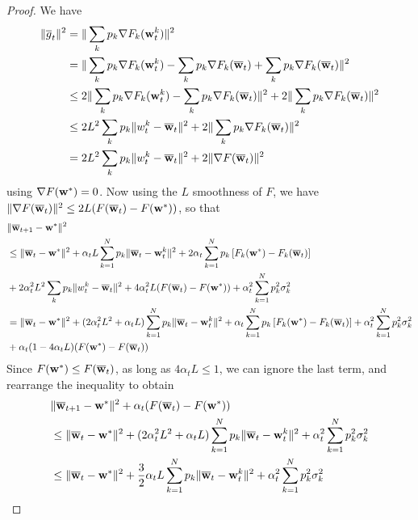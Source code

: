 \begin{proof}
	We have
	\begin{align*}
	\|\overline{g}_{t}\|^{2} & =\|\sum_{k}p_{k}\nabla F_{k}({\mathbf{w}}_{t}^{k})\|^{2}\\
	& =\|\sum_{k}p_{k}\nabla F_{k}({\mathbf{w}}_{t}^{k})-\sum_{k}p_{k}\nabla F_{k}({\overline{\mathbf{w}}}_{t})+\sum_{k}p_{k}\nabla F_{k}({\overline{\mathbf{w}}}_{t})\|^{2}\\
	& \leq2\|\sum_{k}p_{k}\nabla F_{k}({\mathbf{w}}_{t}^{k})-\sum_{k}p_{k}\nabla F_{k}({\overline{\mathbf{w}}}_{t})\|^{2}+2\|\sum_{k}p_{k}\nabla F_{k}({\overline{\mathbf{w}}}_{t})\|^{2}\\
	& \leq2L^{2}\sum_{k}p_{k}\|w_{t}^{k}-{\overline{\mathbf{w}}}_{t}\|^{2}+2\|\sum_{k}p_{k}\nabla F_{k}({\overline{\mathbf{w}}}_{t})\|^{2}\\
	& =2L^{2}\sum_{k}p_{k}\|w_{t}^{k}-{\overline{\mathbf{w}}}_{t}\|^{2}+2\|\nabla F({\overline{\mathbf{w}}}_{t})\|^{2}
	\end{align*}
	using $\nabla F({\mathbf{w}}^{\ast})=0$. Now using the $L$ smoothness of $F$,
	we have $\|\nabla F({\overline{\mathbf{w}}}_{t})\|^{2}\leq2L(F({\overline{\mathbf{w}}}_{t})-F({\mathbf{w}}^{\ast}))$,
	so that 
	\begin{align*}
	& \|{\overline{\mathbf{w}}}_{t+1}-{\mathbf{w}}^{\ast}\|^{2}\\
	& \leq\|{\overline{\mathbf{w}}}_{t}-{\mathbf{w}}^{\ast}\|^{2}+\alpha_{t}L\sum_{k=1}^{N}p_{k}\|{\overline{\mathbf{w}}}_{t}-{\mathbf{w}}_{t}^{k}\|^{2}+2\alpha_{t}\sum_{k=1}^{N}p_{k}\left[F_{k}({\mathbf{w}}^{\ast})-F_{k}({\overline{\mathbf{w}}}_{t})\right]\\
	& +2\alpha_{t}^{2}L^{2}\sum_{k}p_{k}\|w_{t}^{k}-{\overline{\mathbf{w}}}_{t}\|^{2}+4\alpha_{t}^{2}L(F({\overline{\mathbf{w}}}_{t})-F({\mathbf{w}}^{\ast}))+\alpha_{t}^{2}\sum_{k=1}^{N}p_{k}^{2}\sigma_{k}^{2}\\
	& =\|{\overline{\mathbf{w}}}_{t}-{\mathbf{w}}^{\ast}\|^{2}+(2\alpha_{t}^{2}L^{2}+\alpha_{t}L)\sum_{k=1}^{N}p_{k}\|{\overline{\mathbf{w}}}_{t}-{\mathbf{w}}_{t}^{k}\|^{2}+\alpha_{t}\sum_{k=1}^{N}p_{k}\left[F_{k}({\mathbf{w}}^{\ast})-F_{k}({\overline{\mathbf{w}}}_{t})\right]+\alpha_{t}^{2}\sum_{k=1}^{N}p_{k}^{2}\sigma_{k}^{2}\\
	& +\alpha_{t}(1-4\alpha_{t}L)(F({\mathbf{w}}^{\ast})-F({\overline{\mathbf{w}}}_{t}))
	\end{align*}
	Since $F({\mathbf{w}}^{\ast})\leq F({\overline{\mathbf{w}}}_{t})$, as long as $4\alpha_{t}L\leq1$,
	we can ignore the last term, and rearrange the inequality to obtain
	\begin{align*}
	& \|{\overline{\mathbf{w}}}_{t+1}-{\mathbf{w}}^{\ast}\|^{2}+\alpha_{t}(F({\overline{\mathbf{w}}}_{t})-F({\mathbf{w}}^{\ast}))\\
	& \leq\|{\overline{\mathbf{w}}}_{t}-{\mathbf{w}}^{\ast}\|^{2}+(2\alpha_{t}^{2}L^{2}+\alpha_{t}L)\sum_{k=1}^{N}p_{k}\|{\overline{\mathbf{w}}}_{t}-{\mathbf{w}}_{t}^{k}\|^{2}+\alpha_{t}^{2}\sum_{k=1}^{N}p_{k}^{2}\sigma_{k}^{2}\\
	& \leq\|{\overline{\mathbf{w}}}_{t}-{\mathbf{w}}^{\ast}\|^{2}+\frac{3}{2}\alpha_{t}L\sum_{k=1}^{N}p_{k}\|{\overline{\mathbf{w}}}_{t}-{\mathbf{w}}_{t}^{k}\|^{2}+\alpha_{t}^{2}\sum_{k=1}^{N}p_{k}^{2}\sigma_{k}^{2}
	\end{align*}
	

\end{proof}

